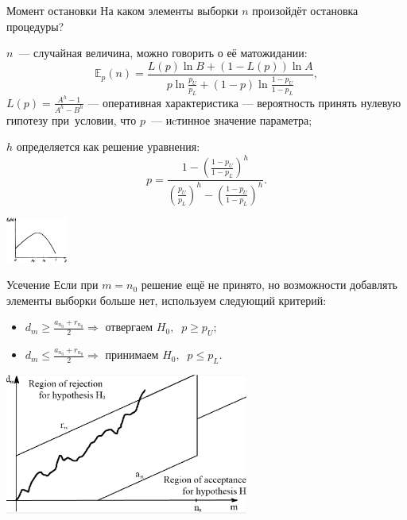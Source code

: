 \documentclass[9pt,pdf,utf8,hyperref={unicode},aspectratio=169]{beamer}
\renewcommand{\leq}{\leqslant}
\renewcommand{\geq}{\geqslant}
\begin{document}
\begin{frame}{Момент остановки}
    На каком элементы выборки $n$ произойдёт остановка процедуры?

    \bigskip

    $n$~--- случайная величина, можно говорить о её матожидании:
    $$\mathbb{E}_p\left(n\right) = \frac{L\left(p\right)\ln B + \left(1-L\left(p\right)\right)\ln A}{p \ln \frac{p_U}{p_L} + \left(1-p\right)\ln\frac{1-p_U}{1-p_L}},$$
    $L\left(p\right) = \frac{A^h-1}{A^h-B^h}$ --- оперативная характеристика --- вероятность принять нулевую гипотезу при~условии, что $p$~--- иcтинное значение параметра; 
    
    $h$ определяется как решение уравнения:
    $$p=\frac{1-\left(\frac{1-p_U}{1-p_L}\right)^h}{\left(\frac{p_U}{p_L}\right)^h-\left(\frac{1-p_U}{1-p_L}\right)^h}.$$
    \begin{center}
    \includegraphics[width=0.15\textwidth]{wald3.eps}
    \end{center}
\end{frame}

\begin{frame}{Усечение}
    Если при $m = n_0$ решение ещё не принято, но возможности добавлять элементы выборки больше нет, используем следующий критерий:
    \begin{itemize}
    \item $d_m\geq \frac{a_{n_0} + r_{n_0}}{2} \Rightarrow$ отвергаем $H_0,\;\; p\geq p_U;$
    \item $d_m\leq \frac{a_{n_0} + r_{n_0}}{2} \Rightarrow$ принимаем $H_0,\;\; p\leq p_L$.
    \end{itemize}

    \bigskip

    \begin{center}
    \includegraphics[width=0.6\textwidth]{wald2.png}
    \end{center}
\end{frame}
\end{document}
